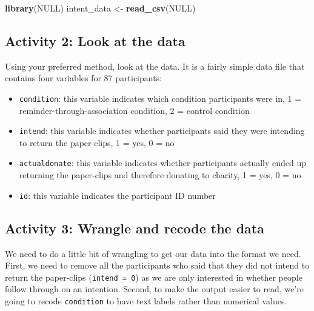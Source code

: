 \documentclass[]{book}
\newenvironment{Shaded}{\begin{snugshade}}{\end{snugshade}}
\newcommand{\KeywordTok}[1]{\textcolor[rgb]{0.13,0.29,0.53}{\textbf{#1}}}
\newcommand{\NormalTok}[1]{#1}
\newcommand{\OtherTok}[1]{\textcolor[rgb]{0.56,0.35,0.01}{#1}}
\newcommand{\StringTok}[1]{\textcolor[rgb]{0.31,0.60,0.02}{#1}}
\providecommand{\tightlist}{%
  \setlength{\itemsep}{0pt}\setlength{\parskip}{0pt}}
\begin{document}
\begin{Shaded}
\begin{Highlighting}[]
\KeywordTok{library}\NormalTok{(}\OtherTok{NULL}\NormalTok{)}
\NormalTok{intent_data <-}\StringTok{ }\KeywordTok{read_csv}\NormalTok{(}\OtherTok{NULL}\NormalTok{)}
\end{Highlighting}
\end{Shaded}

\hypertarget{activity-2-look-at-the-data-1}{%
\subsection{Activity 2: Look at the data}\label{activity-2-look-at-the-data-1}}

Using your preferred method, look at the data. It is a fairly simple data file that contains four variables for 87 participants:

\begin{itemize}
\tightlist
\item
  \texttt{condition}: this variable indicates which condition participants were in, 1 = reminder-through-association condition, 2 = control condition
\item
  \texttt{intend}: this variable indicates whether participants said they were intending to return the paper-clips, 1 = yes, 0 = no
\item
  \texttt{actualdonate}: this variable indicates whether participants actually ended up returning the paper-clips and therefore donating to charity, 1 = yes, 0 = no
\item
  \texttt{id}: this variable indicates the participant ID number
\end{itemize}

\hypertarget{activity-3-wrangle-and-recode-the-data}{%
\subsection{Activity 3: Wrangle and recode the data}\label{activity-3-wrangle-and-recode-the-data}}

We need to do a little bit of wrangling to get our data into the format we need. First, we need to remove all the participants who said that they did not intend to return the paper-clips (\texttt{intend\ =\ 0}) as we are only interested in whether people follow through on an intention. Second, to make the output easier to read, we're going to recode \texttt{condition} to have text labels rather than numerical values.
\end{document}
